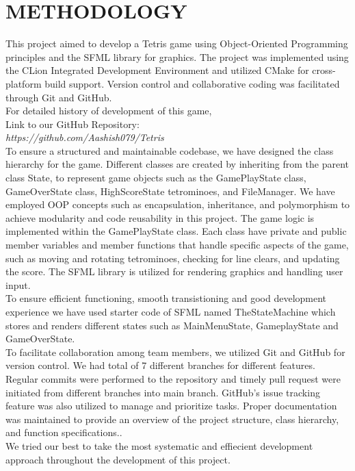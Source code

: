 	\newpage
\section{METHODOLOGY}
\hspace{5mm}This  project aimed to develop a Tetris game using Object-Oriented Programming principles and the SFML library for graphics. The project was implemented using the CLion Integrated Development Environment and utilized CMake for cross-platform build support. Version control and collaborative coding was facilitated through Git and GitHub.\\
For detailed history of development of this game,\\
Link to our GitHub Repository:\\
\textit{https://github.com/Aashish079/Tetris}\\



To ensure a structured and maintainable codebase, we have designed the class hierarchy for the game. Different classes are created by inheriting from the parent class State, to represent game objects such as the GamePlayState class, GameOverState class, HighScoreState tetrominoes, and FileManager. We have employed OOP concepts such as encapsulation, inheritance, and polymorphism to achieve modularity and code reusability in this project. The game logic is implemented within the GamePlayState class. Each class have private and public member variables and member functions that handle specific aspects of the game, such as moving and rotating tetrominoes, checking for line clears, and updating the score. The SFML library is utilized for rendering graphics and handling user input.\\

To ensure efficient functioning, smooth transistioning and good development experience we have used starter code of SFML named TheStateMachine which stores and renders different states such as MainMenuState, GameplayState and GameOverState.\\

To facilitate collaboration among team members, we utilized Git and GitHub for version control. We had total of 7 different branches for different features. Regular commits were performed to the repository and timely pull request were initiated from different branches into main branch. GitHub's issue tracking feature was also utilized to manage and prioritize tasks. Proper documentation was maintained to provide an overview of the project structure, class hierarchy, and function specifications..\\

We tried our best to take the most systematic and effiecient development \\approach throughout the development of this project.\\
